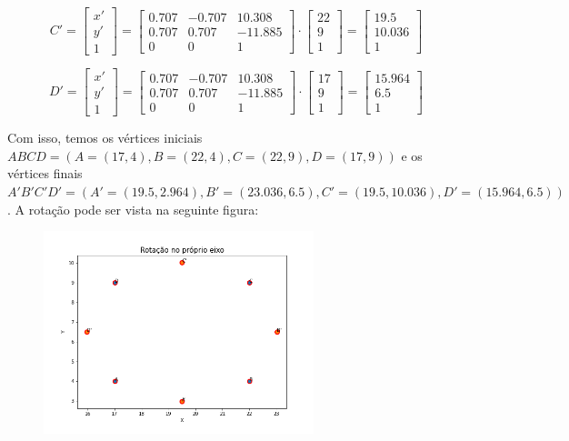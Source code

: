 \documentclass{article}
\begin{document}
$$C' = \begin{bmatrix}
	x'\\
	y'\\
	1
\end{bmatrix} = \begin{bmatrix}
	0.707 & -0.707 & 10.308\\
	0.707 & 0.707 & -11.885\\
	0 & 0 & 1
\end{bmatrix} \cdot \begin{bmatrix}
	22\\
	9\\
	1
\end{bmatrix} = \begin{bmatrix}
	19.5\\
	10.036\\
	1
\end{bmatrix}$$

$$D' = \begin{bmatrix}
	x'\\
	y'\\
	1
\end{bmatrix} = \begin{bmatrix}
	0.707 & -0.707 & 10.308\\
	0.707 & 0.707 & -11.885\\
	0 & 0 & 1
\end{bmatrix} \cdot \begin{bmatrix}
	17\\
	9\\
	1
\end{bmatrix} = \begin{bmatrix}
	15.964\\
	6.5\\
	1
\end{bmatrix}$$

Com isso, temos os vértices iniciais $ABCD = (A=(17, 4), B=(22, 4), C=(22, 9), D=(17, 9))$ e os vértices finais $A'B'C'D' = (A'=(19.5, 2.964), B'=(23.036, 6.5), C'=(19.5, 10.036), D'=(15.964, 6.5))$. A rotação pode ser vista na seguinte figura:

\begin{figure}[htb]
	\centering
	\includegraphics[width=0.7\textwidth]{img/rotation.png}
	\label{fig:rot}
\end{figure}
\end{document}
